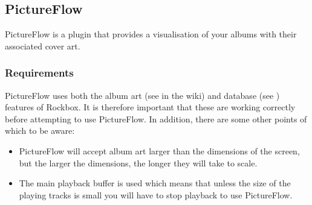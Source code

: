 \subsection{PictureFlow}
PictureFlow is a plugin that provides a visualisation of your albums with
their associated cover art.

\subsubsection{Requirements}
PictureFlow uses both the album art (see  in the wiki) and 
database (see ) features of Rockbox.
It is therefore important that these are working correctly before attempting
to use PictureFlow. In addition, there are some other points of which to be
aware:

  \begin{itemize}
    \item PictureFlow will accept album art larger than the dimensions of the
    screen, but the larger the dimensions, the longer they will take to scale.
    \item The main playback buffer is used which means that unless the size of the
    playing tracks is small you will have to stop playback to use PictureFlow.
  \end{itemize}


